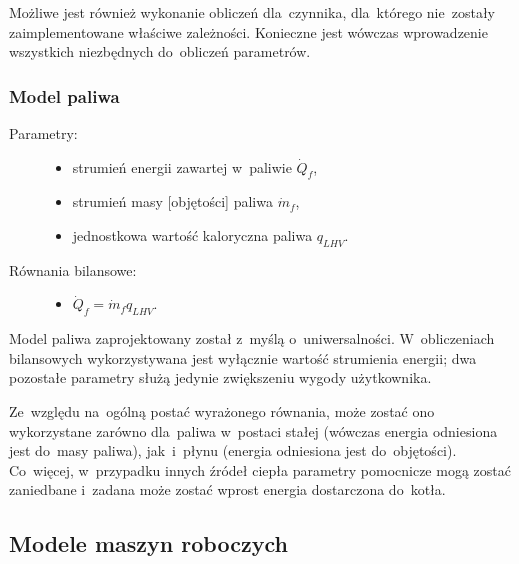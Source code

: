 Możliwe jest również wykonanie obliczeń dla~czynnika, dla~którego
nie~zostały zaimplementowane właściwe zależności. Konieczne jest wówczas
wprowadzenie wszystkich niezbędnych do~obliczeń parametrów.


\subsubsection{Model paliwa}


\begin{description}

	\item[Parametry:] \hfill

		\begin{itemize}

			\item strumień energii zawartej w~paliwie $\dot Q_f$,

			\item strumień masy [objętości] paliwa $\dot m_f$,

			\item jednostkowa wartość kaloryczna paliwa $q_{LHV}$.

		\end{itemize}

	\item[Równania bilansowe:] \hfill

		\begin{itemize}

			\item $\dot Q_f = \dot m_f q_{LHV}$.

		\end{itemize}

\end{description}

Model paliwa zaprojektowany został z~myślą o~uniwersalności.
W~obliczeniach bilansowych wykorzystywana jest wyłącznie wartość
strumienia energii; dwa pozostałe parametry służą jedynie zwiększeniu
wygody użytkownika.

Ze~względu na~ogólną postać wyrażonego równania, może zostać ono
wykorzystane zarówno dla~paliwa w~postaci stałej (wówczas energia
odniesiona jest do~masy paliwa), jak~i~płynu (energia odniesiona jest
do~objętości). Co~więcej, w~przypadku innych źródeł ciepła parametry
pomocnicze mogą zostać zaniedbane i~zadana może zostać wprost energia
dostarczona do~kotła.


\subsection{Modele maszyn roboczych}

